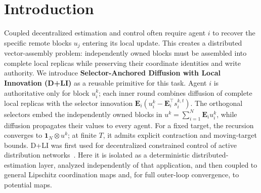 \documentclass[letterpaper, 10 pt, conference]{ieeeconf} %
\begin{document}
\section{Introduction}
 Coupled decentralized estimation and control often require agent \(i\) to recover the specific remote blocks \(u_j\) entering its local update. This creates a distributed vector-assembly problem: independently owned blocks must be assembled into complete local replicas while preserving their coordinate identities and write authority. We introduce \textbf{Selector-Anchored Diffusion with Local Innovation (D+LI)} as a reusable primitive for this task.
Agent \(i\) is authoritative only for block \(u_i^k\); each inner round combines diffusion of complete local replicas with the selector innovation \(\mathbf E_i(u_i^k-\mathbf E_i^\top s_i^{k,t})\). The orthogonal selectors embed the independently owned blocks in \(u^k=\sum_{i=1}^{N}\mathbf{E}_i u_i^k\), while diffusion propagates their values to every agent. For a fixed target, the recursion converges to \(\mathbf1_N\otimes u^k\); at finite \(T\), it admits explicit contraction and moving-target bounds. D+LI was first used for decentralized constrained control of active distribution networks~\cite{fernandes_decentralized_2025}. Here it is isolated as a deterministic distributed-estimation layer, analyzed independently of that application, and then coupled to general Lipschitz coordination maps and, for full outer-loop convergence, to potential maps.
\end{document}
